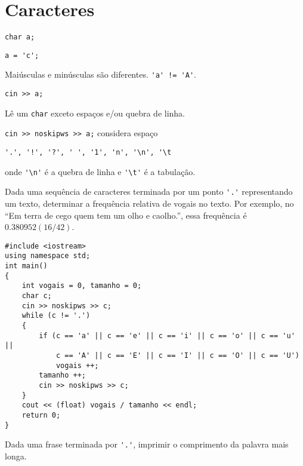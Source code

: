 \documentclass[a4paper]{memoir}
\begin{document}
\section{Caracteres}

\verb|char a;|

\verb|a = 'c';|

Maiúsculas e minúsculas são diferentes. \verb|'a' != 'A'|.

\verb|cin >> a;|

Lê um \verb|char| exceto espaços e/ou quebra de linha.

\verb|cin >> noskipws >> a;| considera espaço

\verb|'.', '!', '?', ' ', '1', 'n', '\n', '\t|

\noindent onde \verb|'\n'| é a quebra de linha e \verb|'\t'| é a tabulação.

\begin{prob}\label{prob206.cpp}
Dada uma sequência de caracteres terminada por um ponto \verb|'.'| representando um texto, determinar a frequência relativa de vogais no texto. Por exemplo, no ``Em terra de cego quem tem um olho e caolho.'', essa frequência é $0.380952 (16/42)$.
\end{prob}

\begin{sol}
\begin{lstlisting}
#include <iostream>
using namespace std;
int main()
{
    int vogais = 0, tamanho = 0;
    char c;
    cin >> noskipws >> c;
    while (c != '.')
    {
        if (c == 'a' || c == 'e' || c == 'i' || c == 'o' || c == 'u' ||
            c == 'A' || c == 'E' || c == 'I' || c == 'O' || c == 'U')
            vogais ++;
        tamanho ++;
        cin >> noskipws >> c;
    }
    cout << (float) vogais / tamanho << endl;
    return 0;
}
\end{lstlisting}
\end{sol}

\begin{prob}\label{prob207.cpp}
Dada uma frase terminada por \verb|'.'|, imprimir o comprimento da palavra mais longa.
\end{prob}
\end{document}
